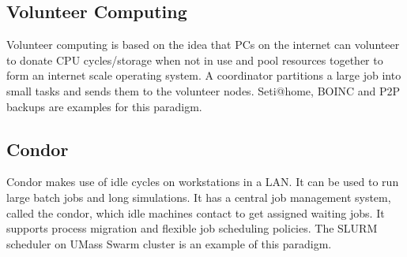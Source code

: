 \documentclass[twoside]{article}
\begin{document}
\subsection{Volunteer Computing}

Volunteer computing is based on the idea that PCs on the internet can volunteer to donate CPU cycles/storage when not in use and pool resources together to form an internet scale operating system.  A coordinator partitions a large job into small tasks and sends them to the volunteer nodes. Seti@home, BOINC and P2P backups are examples for this paradigm.

\subsection{Condor}

Condor makes use of idle cycles on workstations in a LAN. It can be used to run large batch jobs and long
simulations. It has a central job management system, called the condor, which idle machines contact to get assigned waiting jobs. It supports process migration and flexible job scheduling policies. The SLURM scheduler on UMass Swarm cluster is an example of this paradigm.
\end{document}
